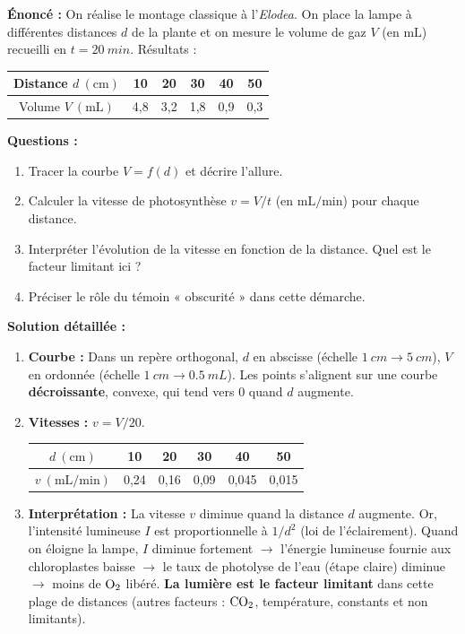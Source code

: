 \documentclass[11pt]{article}
\begin{document}
\begin{exoresolu}
    \textbf{Énoncé :} On réalise le montage classique à l'\emph{Elodea}. On place la lampe à différentes distances $d$ de la plante et on mesure le volume de gaz $V$ (en $\text{mL}$) recueilli en $t = \SI{20}{min}$. Résultats :
    \begin{center}
        \begin{tabular}{|c|c|c|c|c|c|}\hline
        Distance $d\ (\text{cm})$ & 10 & 20 & 30 & 40 & 50 \\ \hline
        Volume $V\ (\text{mL})$ & 4,8 & 3,2 & 1,8 & 0,9 & 0,3 \\ \hline
        \end{tabular}
    \end{center}
    \textbf{Questions :}
    \begin{enumerate}
        \item Tracer la courbe $V = f(d)$ et décrire l'allure.
        \item Calculer la vitesse de photosynthèse $v = V/t$ (en $\text{mL/min}$) pour chaque distance.
        \item Interpréter l'évolution de la vitesse en fonction de la distance. Quel est le facteur limitant ici ?
        \item Préciser le rôle du témoin « obscurité » dans cette démarche.
    \end{enumerate}
    \tcblower
    \textbf{Solution détaillée :}
    \begin{enumerate}
        \item \textbf{Courbe :} Dans un repère orthogonal, $d$ en abscisse (échelle $\SI{1}{cm} \rightarrow \SI{5}{cm}$), $V$ en ordonnée (échelle $\SI{1}{cm} \rightarrow \SI{0,5}{mL}$). Les points s'alignent sur une courbe \textbf{décroissante}, convexe, qui tend vers 0 quand $d$ augmente.
        \item \textbf{Vitesses :} $v = V / 20$.
        \begin{center}
            \begin{tabular}{|c|c|c|c|c|c|}\hline
            $d\ (\text{cm})$ & 10 & 20 & 30 & 40 & 50 \\ \hline
            $v\ (\text{mL/min})$ & 0,24 & 0,16 & 0,09 & 0,045 & 0,015 \\ \hline
            \end{tabular}
        \end{center}
        \item \textbf{Interprétation :} La vitesse $v$ diminue quand la distance $d$ augmente. Or, l'intensité lumineuse $I$ est proportionnelle à $1/d^2$ (loi de l'éclairement). Quand on éloigne la lampe, $I$ diminue fortement $\rightarrow$ l'énergie lumineuse fournie aux chloroplastes baisse $\rightarrow$ le taux de photolyse de l'eau (étape claire) diminue $\rightarrow$ moins de $\ce{O2}$ libéré. \textbf{La lumière est le facteur limitant} dans cette plage de distances (autres facteurs : $\ce{CO2}$, température, constants et non limitants).

\end{enumerate}
\end{exoresolu}
\end{document}
